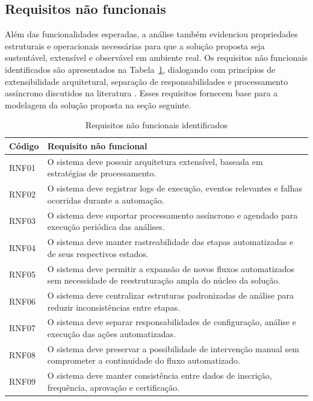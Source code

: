 \subsection{Requisitos não funcionais}
\label{sec:metod:requisitos:nao-funcionais}

Além das funcionalidades esperadas, a análise também evidenciou
propriedades estruturais e operacionais necessárias para que a solução
proposta seja sustentável, extensível e observável em ambiente real. Os
requisitos não funcionais identificados são apresentados na
Tabela~\ref{tab:requisitos-nao-funcionais-levantamento}, dialogando com
princípios de extensibilidade arquitetural, separação de
responsabilidades e processamento assíncrono discutidos na literatura
\cite{GammaEtAl1994,ServiceLayerPattern2024,LaravelQueues2024,LaravelScheduler2024}.
Esses requisitos fornecem base para a modelagem da solução proposta na
seção seguinte.

\begin{table}[H]
\centering
\caption{Requisitos não funcionais identificados}
\label{tab:requisitos-nao-funcionais-levantamento}
\begin{tabular}{p{2cm} p{12cm}}
\hline
\textbf{Código} & \textbf{Requisito não funcional} \\
\hline
RNF01 & O sistema deve possuir arquitetura extensível, baseada em estratégias de processamento. \\
\hline
RNF02 & O sistema deve registrar logs de execução, eventos relevantes e falhas ocorridas durante a automação. \\
\hline
RNF03 & O sistema deve suportar processamento assíncrono e agendado para execução periódica das análises. \\
\hline
RNF04 & O sistema deve manter rastreabilidade das etapas automatizadas e de seus respectivos estados. \\
\hline
RNF05 & O sistema deve permitir a expansão de novos fluxos automatizados sem necessidade de reestruturação ampla do núcleo da solução. \\
\hline
RNF06 & O sistema deve centralizar estruturas padronizadas de análise para reduzir inconsistências entre etapas. \\
\hline
RNF07 & O sistema deve separar responsabilidades de configuração, análise e execução das ações automatizadas. \\
\hline
RNF08 & O sistema deve preservar a possibilidade de intervenção manual sem comprometer a continuidade do fluxo automatizado. \\
\hline
RNF09 & O sistema deve manter consistência entre dados de inscrição, frequência, aprovação e certificação. \\
\hline
\end{tabular}
\end{table}

